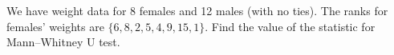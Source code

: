 
\begin{question}
We have weight data for 8 females and 12 males (with no ties). The ranks for females' weights are \(\{6, 8, 2, 5, 4, 9, 15, 1\}\). Find the value of the statistic for Mann--Whitney U test.
\end{question}


